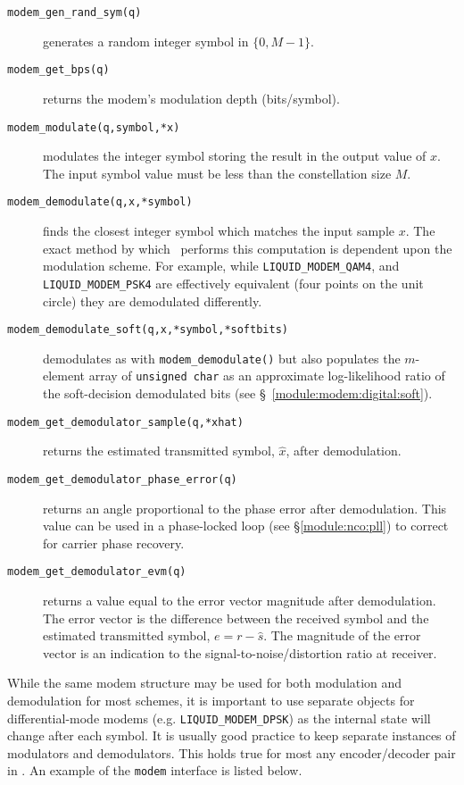 \begin{description}
\item[{\tt modem\_gen\_rand\_sym(q)}]
    generates a random integer symbol in $\{0,M-1\}$.
\item[{\tt modem\_get\_bps(q)}]
    returns the modem's modulation depth (bits/symbol).
\item[{\tt modem\_modulate(q,symbol,*x)}]
    modulates the integer symbol storing the result in the output value
    of $x$.
    The input symbol value must be less than the constellation size $M$.
\item[{\tt modem\_demodulate(q,x,*symbol)}]
    finds the closest integer symbol which matches the input sample $x$.
    The exact method by which \liquid\ performs this computation is
    dependent upon the modulation scheme.
    For example, while
    {\tt LIQUID\_MODEM\_QAM4}, and
    {\tt LIQUID\_MODEM\_PSK4}
    are effectively equivalent (four points on the unit circle)
    they are demodulated differently.
\item[{\tt modem\_demodulate\_soft(q,x,*symbol,*softbits)}]
    demodulates as with {\tt modem\_demodulate()} but also populates the
    $m$-element array of {\tt unsigned char} as an approximate
    log-likelihood ratio of the soft-decision
    demodulated bits (see \S~\ref{module:modem:digital:soft}).
\item[{\tt modem\_get\_demodulator\_sample(q,*xhat)}]
    returns the estimated transmitted symbol, $\hat{x}$, after
    demodulation.
\item[{\tt modem\_get\_demodulator\_phase\_error(q)}]
    returns an angle proportional to the phase error after demodulation.
    This value can be used in a phase-locked loop
    (see \S\ref{module:nco:pll})
    to correct for carrier phase recovery.
\item[{\tt modem\_get\_demodulator\_evm(q)}]
    returns a value equal to the error vector magnitude after demodulation.
    The error vector is the difference between the received symbol and the
    estimated transmitted symbol, $e = r - \hat{s}$.
    The magnitude of the error vector is an indication to the
    signal-to-noise/distortion ratio at receiver.
\end{description}

While the same modem structure may be used for both modulation and
demodulation for most schemes, it is important to use separate objects
for differential-mode modems (e.g. {\tt LIQUID\_MODEM\_DPSK}) as the internal state
will change after each symbol.
It is usually good practice to keep separate instances of modulators and
demodulators.
This holds true for most any encoder/decoder pair in \liquid.
%
An example of the {\tt modem} interface is listed below.
%

%

